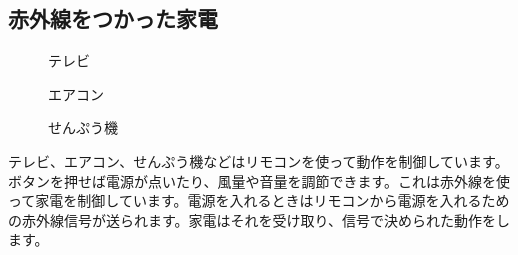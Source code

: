 \subsection{赤外線をつかった家電}

\begin{figure}[H]
  \begin{minipage}[t]{0.3\columnwidth}
    \centering
 
    \caption{テレビ}
  \end{minipage}
  \begin{minipage}[t]{0.3\columnwidth}
    \centering
    
    \caption{エアコン}
  \end{minipage}
  \begin{minipage}[t]{0.3\columnwidth}
    \centering
    
    \caption{せんぷう機}
  \end{minipage}
\end{figure}

テレビ、エアコン、せんぷう機などはリモコンを使って動作を制御しています。ボタンを押せば電源が点いたり、風量や音量を調節できます。これは赤外線を使って家電を制御しています。電源を入れるときはリモコンから電源を入れるための赤外線信号が送られます。家電はそれを受け取り、信号で決められた動作をします。
